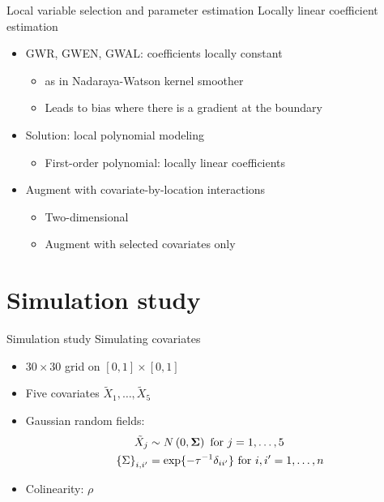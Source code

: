 \documentclass[12pt,t]{beamer}
\newcommand{\subt}[1]{{\footnotesize \color{subtitle} {#1}}}
\begin{document}
\begin{frame}{Local variable selection and  parameter estimation}
\subt{Locally linear coefficient estimation}

\bigskip
\begin{itemize}
  \item GWR, GWEN, GWAL: coefficients locally constant
  \begin{itemize}
    \item as in Nadaraya-Watson kernel smoother
    \item Leads to bias where there is a gradient at the boundary 
  \end{itemize}
  \item Solution: local polynomial modeling
  \begin{itemize}
    \item First-order polynomial: locally linear coefficients
  \end{itemize}
  \item Augment with covariate-by-location interactions
  \begin{itemize}
    \item Two-dimensional
    \item Augment with selected covariates only
  \end{itemize}
\end{itemize}

\end{frame}




\section{Simulation study}




\begin{frame}{Simulation study}
\subt{Simulating covariates}

\bigskip
\begin{itemize}
  \item $30 \times 30$ grid on $[0,1] \times [0,1]$
  \item Five covariates $\tilde{X}_1, \dots, \tilde{X}_5$ 
  \item Gaussian random fields:
  \begin{align}
    \tilde{X}_j &\sim N\left(0, \bm{\Sigma}\right) \text{ for } j = 1, \dots, 5 \notag \\
    \left\{\Sigma\right\}_{i,i'} &= \exp \{ -\tau^{-1} \delta_{ii'}\} \text{ for } i,i' = 1, \dots, n \notag
  \end{align}
  \item Colinearity: $\rho$
\end{itemize}

\end{frame}
\end{document}
